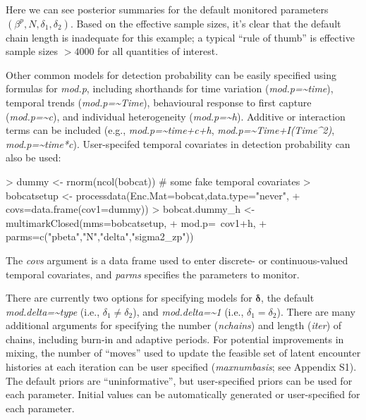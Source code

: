 \documentclass[12pt]{article}
\begin{document}
Here we can see posterior summaries for the default monitored parameters $(\beta^p, N, \delta_1, \delta_2)$. Based on the effective sample sizes, it's clear that the default chain length is inadequate for this example; a typical ``rule of thumb'' is effective sample sizes $>4000$ for all quantities of interest.

Other common models for detection probability can be easily specified using formulas for \textit{mod.p}, including shorthands for time variation (\textit{mod.p={\~{}}time}), temporal trends (\textit{mod.p={\~{}}Time}), behavioural response to first capture (\textit{mod.p={\~{}}c}), and individual heterogeneity (\textit{mod.p={\~{}}h}). Additive or interaction terms can be included (e.g., \textit{mod.p={\~{}}time+c+h}, \textit{mod.p=\~{}Time+I(Time\^{}2)}, \textit{mod.p={\~{}}time*c}). User-specifed temporal covariates in detection probability can also be used: 
\begin{Schunk}
\begin{Sinput}
> dummy <- rnorm(ncol(bobcat)) # some fake temporal covariates
> bobcatsetup <- processdata(Enc.Mat=bobcat,data.type="never",
+                     covs=data.frame(cov1=dummy))
> bobcat.dummy_h <- multimarkClosed(mms=bobcatsetup,
+                     mod.p=~cov1+h,
+                     parms=c("pbeta","N","delta","sigma2_zp"))
\end{Sinput}
\end{Schunk}
The \textit{covs} argument is a data frame used to enter discrete- or continuous-valued temporal covariates, and \textit{parms} specifies the parameters to monitor. 

There are currently two options for specifying models for ${\boldsymbol \delta}$, the default \textit{mod.delta={\~{}}type} (i.e., $\delta_1 \ne \delta_2$), and \textit{mod.delta={\~{}}1} (i.e., $\delta_1 = \delta_2$). There are many additional arguments for specifying the number (\textit{nchains}) and length (\textit{iter}) of chains, including burn-in and adaptive periods. For potential improvements in mixing, the number of ``moves'' used to  update the feasible set of latent encounter histories at each iteration can be user specified (\textit{maxnumbasis}; see Appendix S1). The default priors are ``uninformative'', but user-specified priors can be used for each parameter. Initial values can be automatically generated or user-specified for each parameter.
\end{document}
